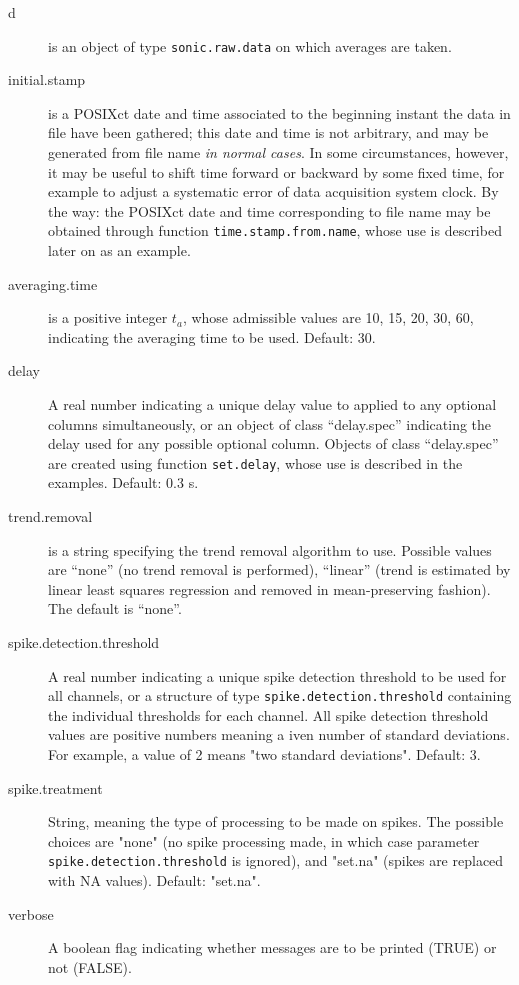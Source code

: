 \documentclass[a4paper,10pt]{book}
\begin{document}
\begin{description}
 \item[d] is an object of type \verb|sonic.raw.data| on which averages are taken.
 \item[initial.stamp] is a POSIXct date and time associated to the beginning instant the data in file have been gathered; this date and time is not arbitrary, and may be generated from file name \emph{in normal cases}. In some circumstances, however, it may be useful to shift time forward or backward by some fixed time, for example to adjust a systematic error of data acquisition system clock. By the way: the POSIXct date and time corresponding to file name may be obtained through function \verb|time.stamp.from.name|, whose use is described later on as an example.
 \item[averaging.time] is a positive integer $t_{a}$, whose admissible values are 10, 15, 20, 30, 60, indicating the averaging time to be used. Default: 30.
 \item[delay] A real number indicating a unique delay value to applied to any optional columns simultaneously, or an object of class ``delay.spec'' indicating the delay used for any possible optional column. Objects of class ``delay.spec'' are created using function \verb|set.delay|, whose use is described in the examples. Default: 0.3 s.
 \item[trend.removal] is a string specifying the trend removal algorithm to use. Possible values are ``none'' (no trend removal is performed), ``linear'' (trend is estimated by linear least squares regression and removed in mean-preserving fashion). The default is ``none''.
 \item[spike.detection.threshold] A real number indicating a unique spike detection threshold to be used for all channels, or a structure of type \verb|spike.detection.threshold| containing the individual thresholds for each channel. All spike detection threshold values are positive numbers meaning a iven number of standard deviations. For example, a value of 2 means "two standard deviations". Default: 3.
 \item[spike.treatment] String, meaning the type of processing to be made on spikes. The possible choices are "none" (no spike processing made, in which case parameter \verb|spike.detection.threshold| is ignored), and "set.na" (spikes are replaced with NA values). Default: "set.na".
 \item[verbose] A boolean flag indicating whether messages are to be printed (TRUE) or not (FALSE).
\end{description}
\end{document}

